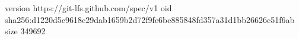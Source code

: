 version https://git-lfs.github.com/spec/v1
oid sha256:d1220d5c9618c29dab1659b2d72f9fe6be885848fd357a31d1bb26626c51f6ab
size 349692
